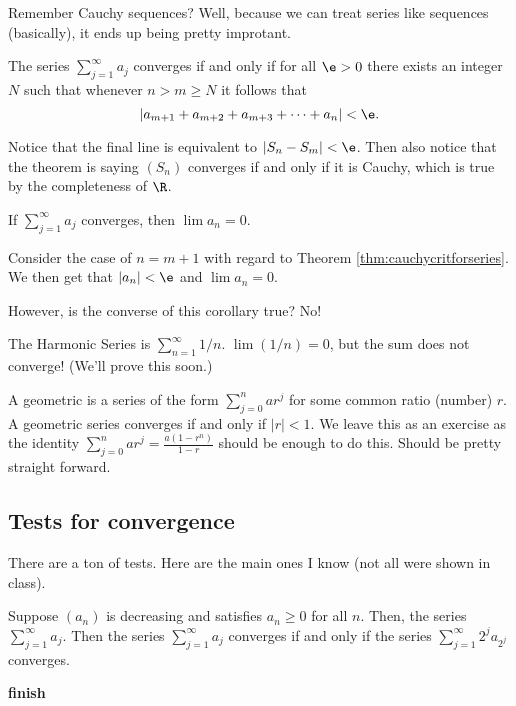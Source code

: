 \documentclass[class=article, crop=false]{standalone}
\begin{document}
Remember Cauchy sequences? Well, because we can treat series like sequences (basically), it ends up being pretty improtant.

\begin{thm}{\label{thm:cauchycritforseries}}
    The series $\sum_{j=1}^{\infty} a_j$ converges if and only if for all $\e > 0$ there exists an integer $N$ such that whenever $n > m \geq N$ it follows that
        \[
            |a_{m+1}+a_{m+2}+a_{m+3}+\cdots+a_n| < \e.
        \]
\end{thm}
\begin{pf}
    Notice that the final line is equivalent to $|S_n-S_m| < \e$. Then also notice that the theorem is saying $(S_n)$ converges if and only if it is Cauchy, which is true by the completeness of $\R$.
\end{pf}

\begin{coro}
    If $\sum_{j=1}^{\infty} a_j$ converges, then $\lim a_n = 0$.
\end{coro}
\begin{pf}
    Consider the case of $n=m+1$ with regard to Theorem \ref{thm:cauchycritforseries}. We then get that $|a_n| < \e$ and $\lim a_n = 0$.
\end{pf}
However, is the converse of this corollary true? No!
\begin{ex}
    The Harmonic Series is $\sum_{n=1}^{\infty} 1/n$. $\lim (1/n) = 0$, but the sum does not converge! (We'll prove this soon.)
\end{ex}

\begin{ex}
    A geometric is a series of the form $\sum_{j=0}^{n} a r^j$ for some common ratio (number) $r$. A geometric series converges if and only if $|r| < 1$. We leave this as an exercise as the identity $\sum_{j=0}^{n} a r^j = \frac{a(1-r^n)}{1-r}$ should be enough to do this. Should be pretty straight forward.
\end{ex}




\subsection{Tests for convergence}

There are a ton of tests. Here are the main ones I know (not all were shown in class).

\begin{thm}
    Suppose $(a_n)$ is decreasing and satisfies $a_n \geq 0$ for all $n$. Then, the series $\sum_{j=1}^{\infty} a_j$. Then the series $\sum_{j=1}^{\infty} a_j$ converges if and only if the series $\sum_{j=1}^{\infty} 2^ja_{2^j}$ converges.
\end{thm}
\begin{pf}
    \textbf{finish}
\end{pf}
\end{document}
